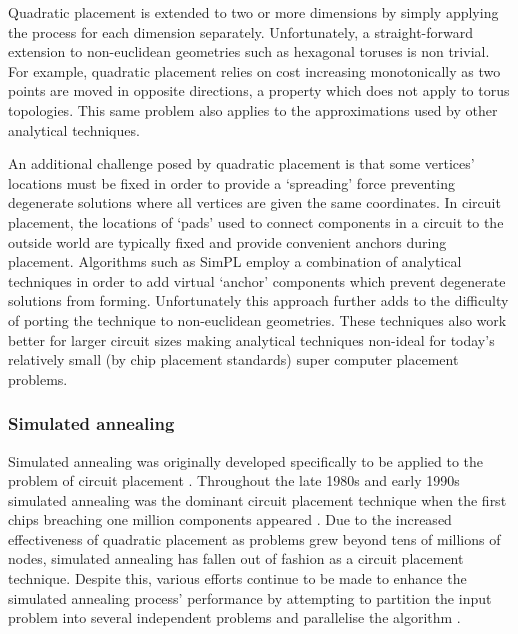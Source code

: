 				Quadratic placement is extended to two or more dimensions by simply
				applying the process for each dimension separately. Unfortunately, a
				straight-forward extension to non-euclidean geometries such as
				hexagonal toruses is non trivial. For example, quadratic placement
				relies on cost increasing monotonically as two points are moved in
				opposite directions, a property which does not apply to torus
				topologies. This same problem also applies to the approximations used
				by other analytical techniques.
				
				An additional challenge posed by quadratic placement is that some
				vertices' locations must be fixed in order to provide a `spreading'
				force preventing degenerate solutions where all vertices are given the
				same coordinates. In circuit placement, the locations of `pads' used to
				connect components in a circuit to the outside world are typically
				fixed and provide convenient anchors during placement. Algorithms such
				as SimPL \cite{kim12b} employ a combination of analytical techniques in
				order to add virtual `anchor' components which prevent degenerate
				solutions from forming. Unfortunately this approach further adds to the
				difficulty of porting the technique to non-euclidean geometries. These
				techniques also work better for larger circuit sizes making analytical
				techniques non-ideal for today's relatively small (by chip placement
				standards) super computer placement problems.
				
			
			\subsubsection{Simulated annealing}
				
				Simulated annealing was originally developed specifically to be applied
				to the problem of circuit placement \cite{kirkpatrick83}. Throughout
				the late 1980s and early 1990s simulated annealing was the dominant
				circuit placement technique when the first chips breaching one million
				components appeared \cite{betz97,sechen85}. Due to the increased
				effectiveness of quadratic placement as problems grew beyond tens of
				millions of nodes, simulated annealing has fallen out of fashion as a
				circuit placement technique. Despite this, various efforts continue to
				be made to enhance the simulated annealing process' performance by
				attempting to partition the input problem into several independent
				problems \cite{choong10,haldar00} and parallelise the algorithm
				\cite{ludwin08}.
				
